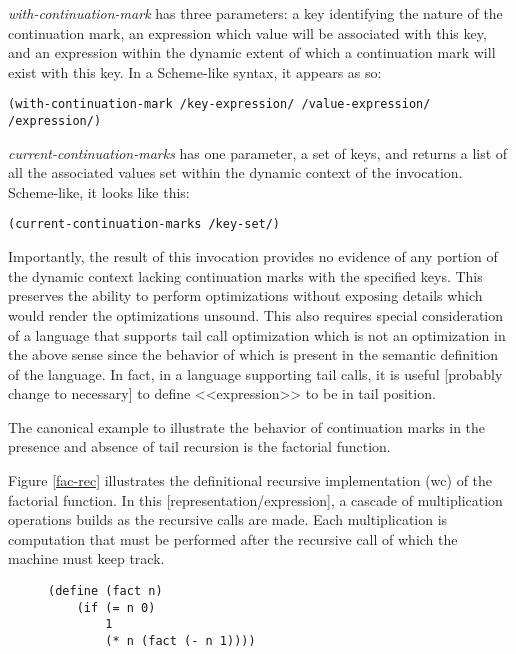 \documentclass[ms]{byuprop}
\begin{document}
\emph{with-continuation-mark} has three parameters: a key identifying the nature of the continuation mark, an expression which value will be associated with this key, and an expression within the dynamic extent of which a continuation mark will exist with this key. In a Scheme-like syntax, it appears as so:

\begin{verbatim}
(with-continuation-mark /key-expression/ /value-expression/ /expression/)
\end{verbatim}

\emph{current-continuation-marks} has one parameter, a set of keys, and returns a list of all the associated values set within the dynamic context of the invocation. Scheme-like, it looks like this:

\begin{verbatim}
(current-continuation-marks /key-set/)
\end{verbatim}

Importantly, the result of this invocation provides no evidence of any portion of the dynamic context lacking continuation marks with the specified keys. This preserves the ability to perform optimizations without exposing details which would render the optimizations unsound. This also requires special consideration of a language that supports tail call optimization which is not an optimization in the above sense since the behavior of which is present in the semantic definition of the language. In fact, in a language supporting tail calls, it is useful [probably change to necessary] to define <<expression>> to be in tail position.

The canonical example to illustrate the behavior of continuation marks in the presence and absence of tail recursion is the factorial function.

Figure \ref{fac-rec} illustrates the definitional recursive implementation (wc) of the factorial function. In this [representation/expression], a cascade of multiplication operations builds as the recursive calls are made. Each multiplication is computation that must be performed after the recursive call of which the machine must keep track.


\begin{figure}
\begin{verbatim}
(define (fact n)
    (if (= n 0)
        1
        (* n (fact (- n 1))))
\end{verbatim}
\end{figure}
\end{document}
